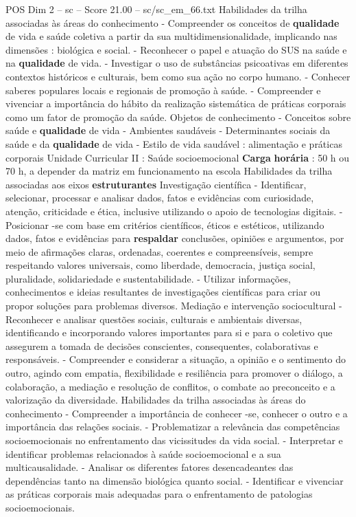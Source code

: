 \begin{textsample}{POS Dim 2 – sc – Score 21.00 – sc/sc\_em\_66.txt}
Habilidades da trilha associadas às áreas do conhecimento - Compreender os conceitos de \textbf{qualidade} de vida e saúde coletiva a partir da sua multidimensionalidade, implicando nas dimensões : biológica e social. - Reconhecer o papel e atuação do SUS na saúde e na \textbf{qualidade} de vida. - Investigar o uso de substâncias psicoativas em diferentes contextos históricos e culturais, bem como sua ação no corpo humano. - Conhecer saberes populares locais e regionais de promoção à saúde. - Compreender e vivenciar a importância do hábito da realização sistemática de práticas corporais como um fator de promoção da saúde.
Objetos de conhecimento - Conceitos sobre saúde e \textbf{qualidade} de vida - Ambientes saudáveis - Determinantes sociais da saúde e da \textbf{qualidade} de vida - Estilo de vida saudável : alimentação e práticas corporais Unidade Curricular II : Saúde socioemocional \textbf{Carga} \textbf{horária} : 50 h ou 70 h, a depender da matriz em funcionamento na escola Habilidades da trilha associadas aos eixos \textbf{estruturantes} Investigação científica - Identificar, selecionar, processar e analisar dados, fatos e evidências com curiosidade, atenção, criticidade e ética, inclusive utilizando o apoio de tecnologias digitais. - Posicionar -se com base em critérios científicos, éticos e estéticos, utilizando dados, fatos e evidências para \textbf{respaldar} conclusões, opiniões e argumentos, por meio de afirmações claras, ordenadas, coerentes e compreensíveis, sempre respeitando valores universais, como liberdade, democracia, justiça social, pluralidade, solidariedade e sustentabilidade. - Utilizar informações, conhecimentos e ideias resultantes de investigações científicas para criar ou propor soluções para problemas diversos.
Mediação e intervenção sociocultural - Reconhecer e analisar questões sociais, culturais e ambientais diversas, identificando e incorporando valores importantes para si e para o coletivo que assegurem a tomada de decisões conscientes, consequentes, colaborativas e responsáveis. - Compreender e considerar a situação, a opinião e o sentimento do outro, agindo com empatia, flexibilidade e resiliência para promover o diálogo, a colaboração, a mediação e resolução de conflitos, o combate ao preconceito e a valorização da diversidade.
Habilidades da trilha associadas às áreas do conhecimento - Compreender a importância de conhecer -se, conhecer o outro e a importância das relações sociais. - Problematizar a relevância das competências socioemocionais no enfrentamento das vicissitudes da vida social. - Interpretar e identificar problemas relacionados à saúde socioemocional e a sua multicausalidade. - Analisar os diferentes fatores desencadeantes das dependências tanto na dimensão biológica quanto social. - Identificar e vivenciar as práticas corporais mais adequadas para o enfrentamento de patologias socioemocionais.

\end{textsample}
